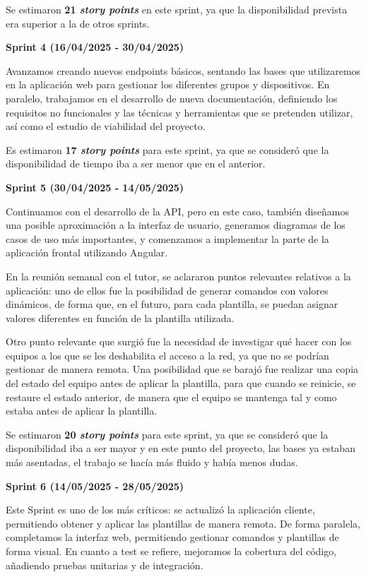 Se estimaron \textbf{21 \textit{story points}} en este sprint, ya que la disponibilidad prevista era superior a la de otros sprints.

\textbf{Sprint 4 (16/04/2025 - 30/04/2025)}

Avanzamos creando nuevos endpoints básicos, sentando las bases que utilizaremos en la aplicación web para gestionar
los diferentes grupos y dispositivos.
En paralelo, trabajamos en el desarrollo de nueva documentación, definiendo los requisitos no funcionales y las técnicas y
herramientas que se pretenden utilizar, así como el estudio de viabilidad del proyecto.

Es estimaron \textbf{17 \textit{story points}} para este sprint, ya que se consideró que la disponibilidad de tiempo
iba a ser menor que en el anterior.

\textbf{Sprint 5 (30/04/2025 - 14/05/2025)}

Continuamos con el desarrollo de la API, pero en este caso, también diseñamos una posible aproximación a la interfaz
de usuario, generamos diagramas de los casos de uso más importantes, y comenzamos a implementar la parte de la aplicación
frontal utilizando Angular.

En la reunión semanal con el tutor, se aclararon puntos relevantes relativos a la aplicación: uno de ellos fue la
posibilidad de generar comandos con valores dinámicos, de forma que, en el futuro, para cada plantilla, se puedan asignar
valores diferentes en función de la plantilla utilizada.

Otro punto relevante que surgió fue la necesidad de investigar qué hacer con los equipos a los que se les deshabilita
el acceso a la red, ya que no se podrían gestionar de manera remota.
Una posibilidad que se barajó fue realizar una copia del estado del equipo antes de aplicar la plantilla, para que cuando se
reinicie, se restaure el estado anterior, de manera que el equipo se mantenga tal y como estaba antes de aplicar la plantilla.

Se estimaron \textbf{20 \textit{story points}} para este sprint, ya que se consideró que la disponibilidad iba a ser mayor y en
este punto del proyecto, las bases ya estaban más asentadas, el trabajo se hacía más fluido y había menos dudas.

\textbf{Sprint 6 (14/05/2025 - 28/05/2025)}

Este Sprint es uno de los más críticos: se actualizó la aplicación cliente, permitiendo obtener y aplicar las plantillas
de manera remota.
De forma paralela, completamos la interfaz web, permitiendo gestionar comandos y plantillas de forma visual.
En cuanto a test se refiere, mejoramos la cobertura del código, añadiendo pruebas unitarias y de integración.

